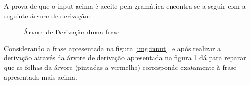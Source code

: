 \documentclass[11pt,a4paper]{report}
\begin{document}
A prova de que o input acima é aceite pela gramática encontra-se a seguir com a seguinte árvore de derivação:


\begin{figure}[H]
\centering
\noindent
{}
\caption{Árvore de Derivação duma frase}
\label{img:derivacao}
\end{figure}

Considerando a frase apresentada na figura \ref{img:input}, e após realizar a derivação através da árvore de derivação apresentada na figura \ref{img:derivacao} dá para reparar que as folhas da árvore (pintadas a vermelho) corresponde exatamente à frase apresentada mais acima.
\end{document}
